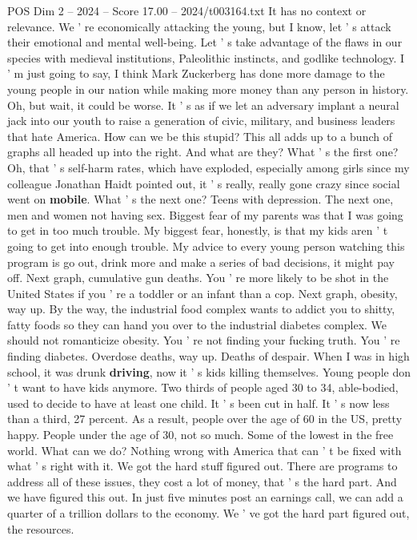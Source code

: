 \begin{textsample}{POS Dim 2 – 2024 – Score 17.00 – 2024/t003164.txt}
It has no context or relevance.
We ' re economically attacking the young, but I know, let ' s attack their emotional and mental well-being.
Let ' s take advantage of the flaws in our species with medieval institutions, Paleolithic instincts, and godlike technology.
I ' m just going to say, I think Mark Zuckerberg has done more damage to the young people in our nation while making more money than any person in history.
Oh, but wait, it could be worse.
It ' s as if we let an adversary implant a neural jack into our youth to raise a generation of civic, military, and business leaders that hate America.
How can we be this stupid?
This all adds up to a bunch of graphs all headed up into the right.
And what are they?
What ' s the first one?
Oh, that ' s self-harm rates, which have exploded, especially among girls since my colleague Jonathan Haidt pointed out, it ' s really, really gone crazy since social went on \textbf{mobile}.
What ' s the next one?
Teens with depression.
The next one, men and women not having sex.
Biggest fear of my parents was that I was going to get in too much trouble.
My biggest fear, honestly, is that my kids aren ' t going to get into enough trouble.
My advice to every young person watching this program is go out, drink more and make a series of bad decisions, it might pay off.
Next graph, cumulative gun deaths.
You ' re more likely to be shot in the United States if you ' re a toddler or an infant than a cop.
Next graph, obesity, way up.
By the way, the industrial food complex wants to addict you to shitty, fatty foods so they can hand you over to the industrial diabetes complex.
We should not romanticize obesity.
You ' re not finding your fucking truth.
You ' re finding diabetes.
Overdose deaths, way up.
Deaths of despair.
When I was in high school, it was drunk \textbf{driving}, now it ' s kids killing themselves.
Young people don ' t want to have kids anymore.
Two thirds of people aged 30 to 34, able-bodied, used to decide to have at least one child.
It ' s been cut in half.
It ' s now less than a third, 27 percent.
As a result, people over the age of 60 in the US, pretty happy.
People under the age of 30, not so much.
Some of the lowest in the free world.
What can we do?
Nothing wrong with America that can ' t be fixed with what ' s right with it.
We got the hard stuff figured out.
There are programs to address all of these issues, they cost a lot of money, that ' s the hard part.
And we have figured this out.
In just five minutes post an earnings call, we can add a quarter of a trillion dollars to the economy.
We ' ve got the hard part figured out, the resources.

\end{textsample}
